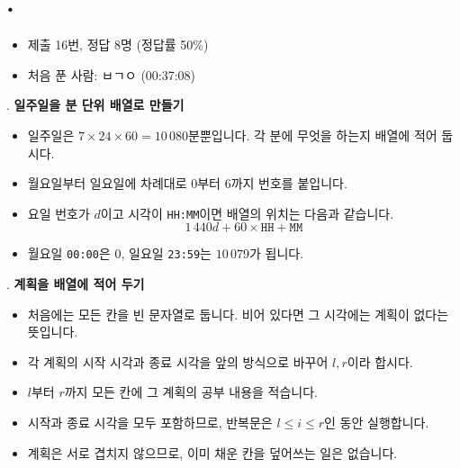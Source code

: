 
\section{\texorpdfstring{\pletter. \ptitle}{문제 \pletter}}

\begin{frame}[label=problem-I]
    \sectiontitle{\pletter}{\ptitle}
    \begin{itemize}
        \item 제출 16번, 정답 8명 (정답률 50\%)
        \item 처음 푼 사람: ㅂㄱㅇ (00:37:08)
    \end{itemize}
\end{frame}

\begin{frame}{\textbf{\pletter}. \ptitle}
    \textbf{일주일을 분 단위 배열로 만들기}
\begin{itemize}
        \item 일주일은 $7\times24\times60=10\,080$분뿐입니다. 각 분에 무엇을 하는지 배열에 적어 둡시다.
        \item 월요일부터 일요일에 차례대로 $0$부터 $6$까지 번호를 붙입니다.
        \item 요일 번호가 $d$이고 시각이 \texttt{HH:MM}이면 배열의 위치는 다음과 같습니다.
        \[
            1\,440d+60\times\texttt{HH}+\texttt{MM}
        \]
        \item 월요일 \texttt{00:00}은 $0$, 일요일 \texttt{23:59}는 $10\,079$가 됩니다.
    \end{itemize}
\end{frame}

\begin{frame}{\textbf{\pletter}. \ptitle}
    \textbf{계획을 배열에 적어 두기}
\begin{itemize}
        \item 처음에는 모든 칸을 빈 문자열로 둡니다. 비어 있다면 그 시각에는 계획이 없다는 뜻입니다.
        \item 각 계획의 시작 시각과 종료 시각을 앞의 방식으로 바꾸어 $l,r$이라 합시다.
        \item $l$부터 $r$까지 모든 칸에 그 계획의 공부 내용을 적습니다.
        \item 시작과 종료 시각을 모두 포함하므로, 반복문은 $l\le i\le r$인 동안 실행합니다.
        \item 계획은 서로 겹치지 않으므로, 이미 채운 칸을 덮어쓰는 일은 없습니다.
    \end{itemize}
\end{frame}

